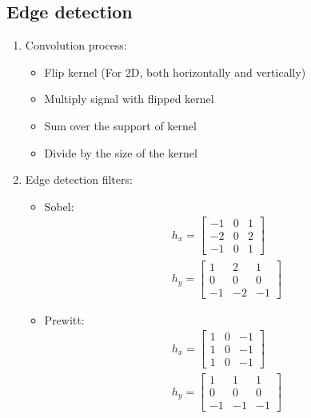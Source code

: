 \documentclass[9pt]{article}
\begin{document}
\begin{multicols*}{2}
    \section{Edge detection}
        \begin{enumerate}
            \item Convolution process:
            \begin{itemize}
                \item Flip kernel (For 2D, both horizontally and vertically)
                \item Multiply signal with flipped kernel 
                \item Sum over the support of kernel
                \item Divide by the size of the kernel
            \end{itemize}
            \item Edge detection filters:
            \begin{itemize}
                \item Sobel:
                {\setlength{\mathindent}{0cm}}
                \begin{gather*}
                    h_{x} = \begin{bmatrix}
                        -1 & 0 & 1 \\
                        -2 & 0 & 2 \\
                        -1 & 0 & 1
                    \end{bmatrix} \\
                    h_{y} = \begin{bmatrix}
                        1 & 2 & 1 \\
                        0 & 0 & 0 \\
                        -1 & -2 & -1
                    \end{bmatrix} 
                \end{gather*}

                \item Prewitt:
                {\setlength{\mathindent}{0cm}}
                \begin{gather*}
                    h_{x} = \begin{bmatrix}
                        1 & 0 & -1 \\
                        1 & 0 & -1 \\
                        1 & 0 & -1
                    \end{bmatrix} \\
                    h_{y} = \begin{bmatrix}
                        1 & 1 & 1 \\
                        0 & 0 & 0 \\
                        -1 & -1 & -1
                    \end{bmatrix} 
                \end{gather*}
            \end{itemize}


\end{enumerate}
\end{multicols*}
\end{document}

